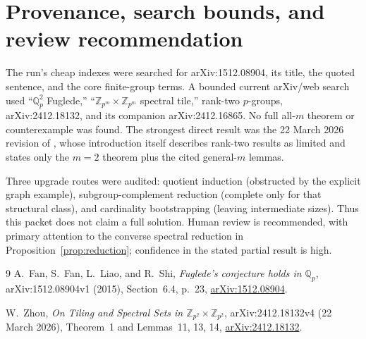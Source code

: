 \documentclass[11pt]{article}
\newcommand{\Qp}{\mathbb Q_p}
\begin{document}
\section*{Provenance, search bounds, and review recommendation}

The run's cheap indexes were searched for arXiv:1512.08904, its title, the
quoted sentence, and the core finite-group terms.  A bounded current
arXiv/web search used ``$\Qp^2$ Fuglede,''
``$\mathbb Z_{p^m}\times\mathbb Z_{p^m}$ spectral tile,'' rank-two
$p$-groups, arXiv:2412.18132, and its companion arXiv:2412.16865.  No full
all-$m$ theorem or counterexample was found.  The strongest direct result was
the 22 March 2026 revision of \cite{Zhou}, whose introduction itself describes
rank-two results as limited and states only the $m=2$ theorem plus the cited
general-$m$ lemmas.

Three upgrade routes were audited: quotient induction (obstructed by the
explicit graph example), subgroup-complement reduction (complete only for
that structural class), and cardinality bootstrapping (leaving intermediate
sizes).  Thus this packet does not claim a full solution.  Human review is
recommended, with primary attention to the converse spectral reduction in
Proposition~\ref{prop:reduction}; confidence in the stated partial result is
high.

\begin{thebibliography}{9}
A.~Fan, S.~Fan, L.~Liao, and R.~Shi,
\emph{Fuglede's conjecture holds in $\mathbb Q_p$},
arXiv:1512.08904v1 (2015), Section~6.4, p.~23,
\href{https://arxiv.org/abs/1512.08904}{arXiv:1512.08904}.

W.~Zhou,
\emph{On Tiling and Spectral Sets in
$\mathbb Z_{p^2}\times\mathbb Z_{p^2}$},
arXiv:2412.18132v4 (22 March 2026), Theorem~1 and Lemmas~11, 13, 14,
\href{https://arxiv.org/abs/2412.18132}{arXiv:2412.18132}.
\end{thebibliography}
\end{document}
